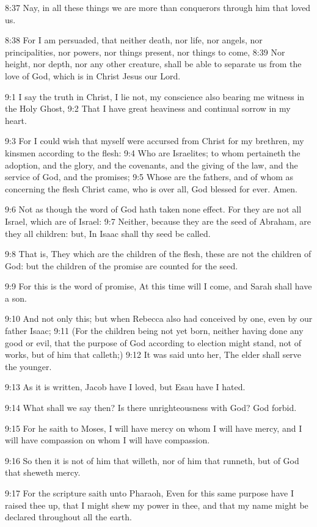 8:37 Nay, in all these things we are more than conquerors through him
that loved us.

8:38 For I am persuaded, that neither death, nor life, nor angels, nor
principalities, nor powers, nor things present, nor things to come,
8:39 Nor height, nor depth, nor any other creature, shall be able to
separate us from the love of God, which is in Christ Jesus our Lord.

9:1 I say the truth in Christ, I lie not, my conscience also bearing
me witness in the Holy Ghost, 9:2 That I have great heaviness and
continual sorrow in my heart.

9:3 For I could wish that myself were accursed from Christ for my
brethren, my kinsmen according to the flesh: 9:4 Who are Israelites;
to whom pertaineth the adoption, and the glory, and the covenants, and
the giving of the law, and the service of God, and the promises; 9:5
Whose are the fathers, and of whom as concerning the flesh Christ
came, who is over all, God blessed for ever. Amen.

9:6 Not as though the word of God hath taken none effect. For they are
not all Israel, which are of Israel: 9:7 Neither, because they are the
seed of Abraham, are they all children: but, In Isaac shall thy seed
be called.

9:8 That is, They which are the children of the flesh, these are not
the children of God: but the children of the promise are counted for
the seed.

9:9 For this is the word of promise, At this time will I come, and
Sarah shall have a son.

9:10 And not only this; but when Rebecca also had conceived by one,
even by our father Isaac; 9:11 (For the children being not yet born,
neither having done any good or evil, that the purpose of God
according to election might stand, not of works, but of him that
calleth;) 9:12 It was said unto her, The elder shall serve the
younger.

9:13 As it is written, Jacob have I loved, but Esau have I hated.

9:14 What shall we say then? Is there unrighteousness with God? God
forbid.

9:15 For he saith to Moses, I will have mercy on whom I will have
mercy, and I will have compassion on whom I will have compassion.

9:16 So then it is not of him that willeth, nor of him that runneth,
but of God that sheweth mercy.

9:17 For the scripture saith unto Pharaoh, Even for this same purpose
have I raised thee up, that I might shew my power in thee, and that my
name might be declared throughout all the earth.

